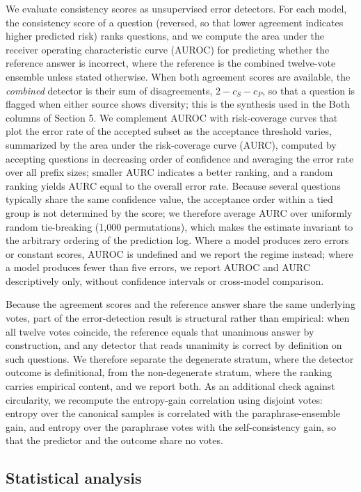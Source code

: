 \documentclass[preprint,12pt]{elsarticle}
\begin{document}
We evaluate consistency scores as unsupervised error detectors. For each model, the consistency score of a question (reversed, so that lower agreement indicates higher predicted risk) ranks questions, and we compute the area under the receiver operating characteristic curve (AUROC) for predicting whether the reference answer is incorrect, where the reference is the combined twelve-vote ensemble unless stated otherwise. When both agreement scores are available, the \emph{combined} detector is their sum of disagreements, $2 - c_{S} - c_{P}$, so that a question is flagged when either source shows diversity; this is the synthesis used in the Both columns of Section 5. We complement AUROC with risk-coverage curves that plot the error rate of the accepted subset as the acceptance threshold varies, summarized by the area under the risk-coverage curve (AURC), computed by accepting questions in decreasing order of confidence and averaging the error rate over all prefix sizes; smaller AURC indicates a better ranking, and a random ranking yields AURC equal to the overall error rate. Because several questions typically share the same confidence value, the acceptance order within a tied group is not determined by the score; we therefore average AURC over uniformly random tie-breaking (1{,}000 permutations), which makes the estimate invariant to the arbitrary ordering of the prediction log. Where a model produces zero errors or constant scores, AUROC is undefined and we report the regime instead; where a model produces fewer than five errors, we report AUROC and AURC descriptively only, without confidence intervals or cross-model comparison.

Because the agreement scores and the reference answer share the same underlying votes, part of the error-detection result is structural rather than empirical: when all twelve votes coincide, the reference equals that unanimous answer by construction, and any detector that reads unanimity is correct by definition on such questions. We therefore separate the degenerate stratum, where the detector outcome is definitional, from the non-degenerate stratum, where the ranking carries empirical content, and we report both. As an additional check against circularity, we recompute the entropy-gain correlation using disjoint votes: entropy over the canonical samples is correlated with the paraphrase-ensemble gain, and entropy over the paraphrase votes with the self-consistency gain, so that the predictor and the outcome share no votes.

\subsection{Statistical analysis}
\end{document}
